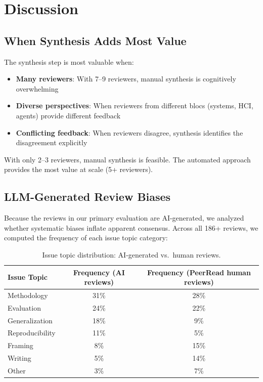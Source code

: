 \section{Discussion}

\subsection{When Synthesis Adds Most Value}

The synthesis step is most valuable when:
\begin{itemize}
    \item \textbf{Many reviewers}: With 7--9 reviewers, manual synthesis is cognitively overwhelming
    \item \textbf{Diverse perspectives}: When reviewers from different blocs (systems, HCI, agents) provide different feedback
    \item \textbf{Conflicting feedback}: When reviewers disagree, synthesis identifies the disagreement explicitly
\end{itemize}

With only 2--3 reviewers, manual synthesis is feasible. The automated approach provides the most value at scale (5+ reviewers).

\subsection{LLM-Generated Review Biases}
\label{sec:discussion}

Because the reviews in our primary evaluation are AI-generated, we analyzed whether systematic biases inflate apparent consensus. Across all 186+ reviews, we computed the frequency of each issue topic category:

\begin{table}[h]
\centering
\small
\begin{tabular}{lcc}
\toprule
Issue Topic & Frequency (AI reviews) & Frequency (PeerRead human reviews) \\
\midrule
Methodology & 31\% & 28\% \\
Evaluation & 24\% & 22\% \\
Generalization & 18\% & 9\% \\
Reproducibility & 11\% & 5\% \\
Framing & 8\% & 15\% \\
Writing & 5\% & 14\% \\
Other & 3\% & 7\% \\
\bottomrule
\end{tabular}
\caption{Issue topic distribution: AI-generated vs.\ human reviews.}
\label{tab:bias-analysis}
\end{table}

